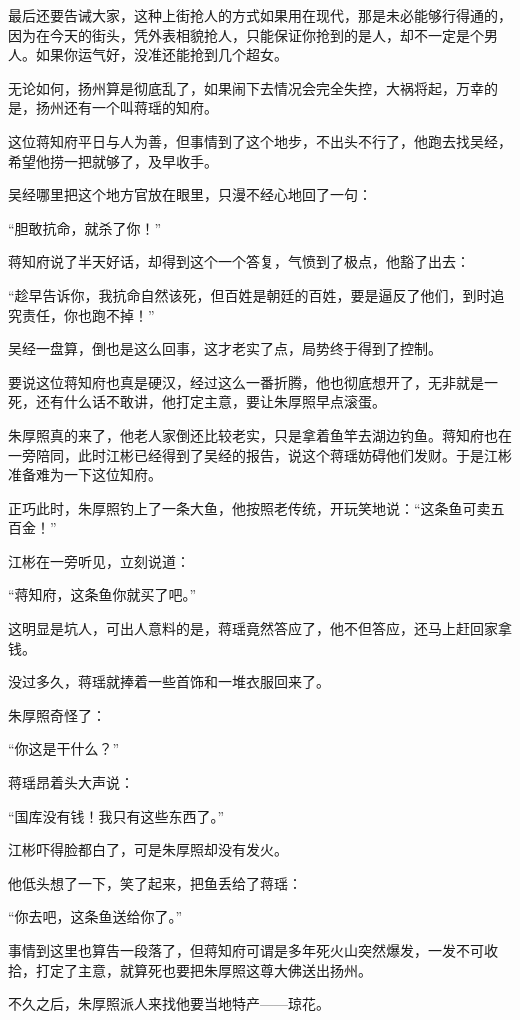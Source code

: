 \begin{multicols}{\theparacolNo}
		最后还要告诫大家，这种上街抢人的方式如果用在现代，那是未必能够行得通的，因为在今天的街头，凭外表相貌抢人，只能保证你抢到的是人，却不一定是个男人。如果你运气好，没准还能抢到几个超女。

		无论如何，扬州算是彻底乱了，如果闹下去情况会完全失控，大祸将起，万幸的是，扬州还有一个叫蒋瑶的知府。

		这位蒋知府平日与人为善，但事情到了这个地步，不出头不行了，他跑去找吴经，希望他捞一把就够了，及早收手。

		吴经哪里把这个地方官放在眼里，只漫不经心地回了一句：

		“胆敢抗命，就杀了你！”

		蒋知府说了半天好话，却得到这个一个答复，气愤到了极点，他豁了出去：

		“趁早告诉你，我抗命自然该死，但百姓是朝廷的百姓，要是逼反了他们，到时追究责任，你也跑不掉！”

		吴经一盘算，倒也是这么回事，这才老实了点，局势终于得到了控制。

		要说这位蒋知府也真是硬汉，经过这么一番折腾，他也彻底想开了，无非就是一死，还有什么话不敢讲，他打定主意，要让朱厚照早点滚蛋。

		朱厚照真的来了，他老人家倒还比较老实，只是拿着鱼竿去湖边钓鱼。蒋知府也在一旁陪同，此时江彬已经得到了吴经的报告，说这个蒋瑶妨碍他们发财。于是江彬准备难为一下这位知府。

		正巧此时，朱厚照钓上了一条大鱼，他按照老传统，开玩笑地说：“这条鱼可卖五百金！”

		江彬在一旁听见，立刻说道：

		“蒋知府，这条鱼你就买了吧。”

		这明显是坑人，可出人意料的是，蒋瑶竟然答应了，他不但答应，还马上赶回家拿钱。

		没过多久，蒋瑶就捧着一些首饰和一堆衣服回来了。

		朱厚照奇怪了：

		“你这是干什么？”

		蒋瑶昂着头大声说：

		“国库没有钱！我只有这些东西了。”

		江彬吓得脸都白了，可是朱厚照却没有发火。

		他低头想了一下，笑了起来，把鱼丢给了蒋瑶：

		“你去吧，这条鱼送给你了。”

		事情到这里也算告一段落了，但蒋知府可谓是多年死火山突然爆发，一发不可收拾，打定了主意，就算死也要把朱厚照这尊大佛送出扬州。

		不久之后，朱厚照派人来找他要当地特产——琼花。


\end{multicols}
